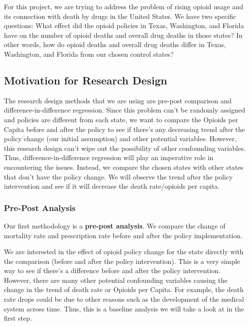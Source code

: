 \documentclass{article}
\begin{document}
For this project, we are trying to address the problem of rising opioid
usage and its connection with death by drugs in the United States. We
have two specific questions: What effect did the opioid policies in
Texas, Washington, and Florida have on the number of opioid deaths and
overall drug deaths in those states? In other words, how do opioid
deaths and overall drug deaths differ in Texas, Washington, and Florida
from our chosen control states?

\hypertarget{motivation-for-research-design}{%
\subsection{\texorpdfstring{Motivation for Research Design
}{Motivation for Research Design }}\label{motivation-for-research-design}}

The research design methods that we are using are pre-post comparison
and difference-in-difference regression. Since this problem can't be
randomly assigned and policies are different from each state, we want to
compare the Opioids per Capita before and after the policy to see if
there's any decreasing trend after the policy change (our initial
assumption) and other potential variables. However, this research design
can't wipe out the possibility of other confounding variables. Thus,
difference-in-difference regression will play an imperative role in
encountering the issues. Instead, we compare the chosen states with
other states that don't have the policy change. We will observe the
trend after the policy intervention and see if it will decrease the
death rate/opioids per capita.

\hypertarget{pre-post-analysis}{%
\subsubsection{Pre-Post Analysis}\label{pre-post-analysis}}

Our first methodology is a \textbf{pre-post analysis}. We compare the
change of mortality rate and prescription rate before and after the
policy implementation.

We are interested in the effect of opioid policy change for the state
directly with the comparison (before and after the policy intervention).
This is a very simple way to see if there's a difference before and
after the policy intervention. However, there are many other potential
confounding variables causing the change in the trend of death rate or
Opioids per Capita. For example, the death rate drops could be due to
other reasons such as the development of the medical system across time.
Thus, this is a baseline analysis we will take a look at in the first
step.
\end{document}
